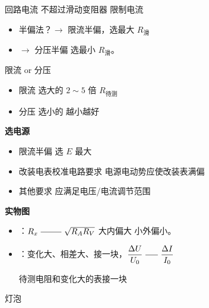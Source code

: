 回路电流 不超过滑动变阻器 限制电流

\begin{itemize}
\item 半偏法？$\to$ 限流半偏，选最大 $R_{\text{滑}}$
\item $\to$ 分压半偏 选最小 $R_{\text{滑}}$。
\end{itemize}

限流 or 分压
\begin{itemize}
\item 限流 选大的 \qquad $2\sim5$ 倍 $R_{\text{待测}}$
\item 分压 选小的 \qquad 越小越好
\end{itemize}
\textbf{选电源}

\begin{itemize}
\item 限流半偏 \quad 选 $E$ 最大
\item 改装电表校准电路要求 \quad 电源电动势应使改装表满偏
\item 其他要求 \quad 应满足电压/电流调节范围
\end{itemize}
\textbf{实物图}

\begin{itemize}
\item {}：$R_x\ \rule[0.5ex]{2.5em}{0.4pt}\ \sqrt{R_AR_V}$ \quad 大内偏大 \quad 小外偏小。
\item {}：变化大、相差大、接一块，$\dfrac{\Delta U}{U_0}\ \rule[0.5ex]{1.5em}{0.4pt}\ \dfrac{\Delta I}{I_0}$

待测电阻和变化大的表接一块
\end{itemize}
灯泡



